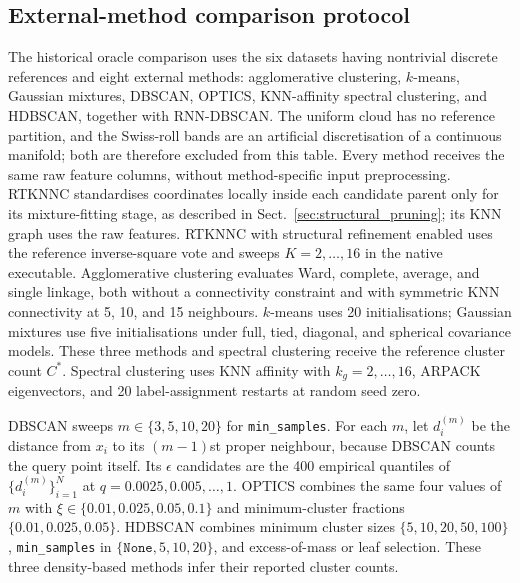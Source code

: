 \documentclass[pdflatex,sn-basic,Numbered]{sn-jnl}
\begin{document}
\subsection{External-method comparison protocol}\label{sec:external_comparison_protocol}

The historical oracle comparison uses the six datasets having nontrivial discrete
references and eight external methods: agglomerative clustering, $k$-means,
Gaussian mixtures, DBSCAN, OPTICS, KNN-affinity spectral clustering, and
HDBSCAN, together with RNN-DBSCAN. The uniform cloud has no reference partition, and the Swiss-roll
bands are an artificial discretisation of a continuous manifold; both are
therefore excluded from this table.  Every method receives the same raw feature columns, without
method-specific input preprocessing. RTKNNC standardises coordinates locally
inside each candidate parent only for its mixture-fitting stage, as described
in Sect.~\ref{sec:structural_pruning}; its KNN graph uses the raw features.
RTKNNC with structural refinement enabled uses the reference inverse-square vote and sweeps
$K=2,\ldots,16$ in the native executable.  Agglomerative clustering evaluates
Ward, complete, average, and single linkage, both without a connectivity
constraint and with symmetric KNN connectivity at 5, 10, and 15 neighbours.
$k$-means uses 20 initialisations; Gaussian mixtures use five initialisations
under full, tied, diagonal, and spherical covariance models.  These three
methods and spectral clustering receive the reference cluster count $C^*$.
Spectral clustering uses KNN affinity with $k_g=2,\ldots,16$, ARPACK
eigenvectors, and 20 label-assignment restarts at random seed zero.

DBSCAN sweeps $m\in\{3,5,10,20\}$ for \texttt{min\_samples}.  For each $m$,
let $d_i^{(m)}$ be the distance from $x_i$ to its $(m-1)$st proper neighbour,
because DBSCAN counts the query point itself.  Its $\epsilon$ candidates are
the 400 empirical quantiles of $\{d_i^{(m)}\}_{i=1}^N$ at
$q=0.0025,0.005,\ldots,1$.  OPTICS combines the same four values of $m$ with
$\xi\in\{0.01,0.025,0.05,0.1\}$ and minimum-cluster fractions
$\{0.01,0.025,0.05\}$.  HDBSCAN combines minimum cluster sizes
$\{5,10,20,50,100\}$, \texttt{min\_samples} in
$\{\texttt{None},5,10,20\}$, and excess-of-mass or leaf selection.  These
three density-based methods infer their reported cluster counts.
\end{document}
